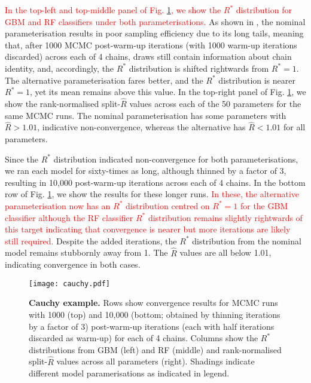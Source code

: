 \documentclass{article}
\begin{document}
\textcolor{red}{In the top-left and top-middle panel of Fig. \ref{fig:cauchy}, we show the $R^*$ distribution for GBM and RF classifiers under both parameterisations.} As shown in \cite{vehtari2019rank}, the nominal parameterisation results in poor sampling efficiency due to its long tails, meaning that, after 1000 MCMC post-warm-up iterations (with 1000 warm-up iterations discarded) across each of 4 chains, draws still contain information about chain identity, and, accordingly, the $R^*$ distribution is shifted rightwards from $R^*=1$. The alternative parameterisation fares better, and the $R^*$ distribution is nearer $R^*=1$, yet its mean remains above this value. In the top-right panel of Fig. \ref{fig:cauchy}, we show the rank-normalised split-$\widehat{R}$ values across each of the 50 parameters for the same MCMC runs. The nominal parameterisation has some parameters with $\widehat{R}>1.01$, indicative non-convergence, whereas the alternative has $\widehat{R}<1.01$ for all parameters.

Since the $R^*$ distribution indicated non-convergence for both parameterisations, we ran each model for sixty-times as long, although thinned by a factor of 3, resulting in 10,000 post-warm-up iterations across each of 4 chains. In the bottom row of Fig. \ref{fig:cauchy}, we show the results for these longer runs. \textcolor{red}{In these, the alternative parameterisation now has an $R^*$ distribution centred on $R^*=1$ for the GBM classifier although the RF classifier $R^*$ distribution remains slightly rightwards of this target indicating that convergence is nearer but more iterations are likely still required.} Despite the added iterations, the $R^*$ distribution from the nominal model remains stubbornly away from 1. The $\widehat{R}$ values are all below 1.01, indicating convergence in both cases.

\begin{figure}[!htb]
	\centerline{\texttt{[image: cauchy.pdf]}}
	\caption{\textbf{Cauchy example.} Rows show convergence results for MCMC runs with 1000 (top) and 10,000 (bottom; obtained by thinning iterations by a factor of 3) post-warm-up iterations (each with half iterations discarded as warm-up) for each of 4 chains. Columns show the $R^*$ distributions from GBM (left) and RF (middle) and rank-normalised split-$\widehat{R}$ values across all parameters (right). Shadings indicate different model paramerisations as indicated in legend.}
	\label{fig:cauchy}
\end{figure}
\end{document}
